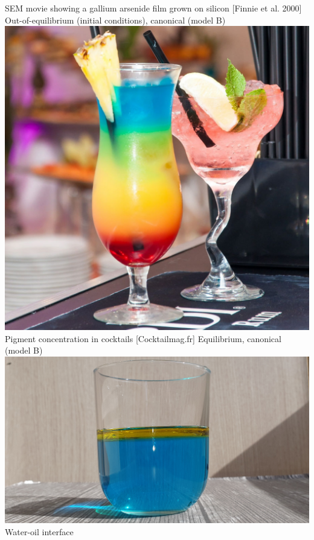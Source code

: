 \documentclass[9pt, dvipsnames,aspectratio=169]{beamer} %
\begin{document}
\begin{frame}
\begin{overprint}
		    SEM movie showing a gallium arsenide film grown on silicon [Finnie et al. 2000]
	    \onslide<4>
	        Out-of-equilibrium (initial conditions), canonical (model B) \\
	        \centering
		    \includegraphics[scale=0.15]{binary-fluid.jpeg} \\
		    Pigment concentration in cocktails [Cocktailmag.fr] 	    
            Equilibrium, canonical (model B) \\
            \centering
            \includegraphics[scale=0.1]{eau-huile.jpg} \\
            Water-oil interface 
	\end{overprint}
\end{frame}
\end{document}
